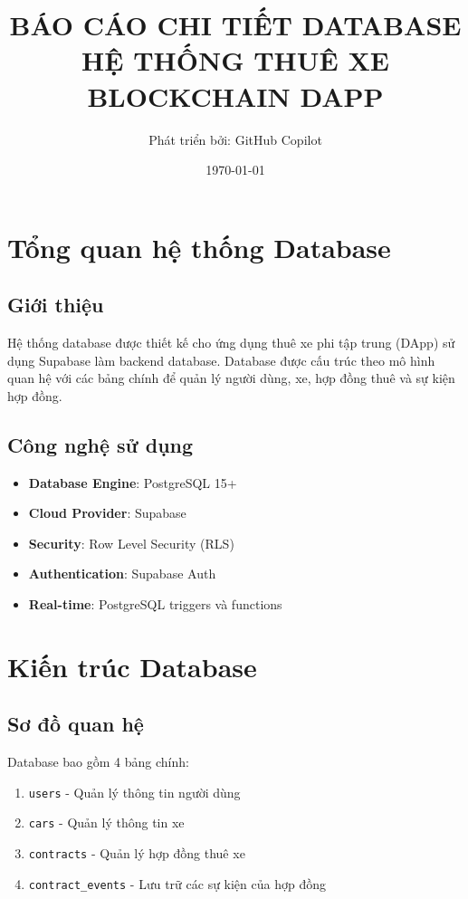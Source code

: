 \documentclass[12pt,a4paper]{article}
\title{\textbf{BÁO CÁO CHI TIẾT DATABASE} \\ 
       \textbf{HỆ THỐNG THUÊ XE BLOCKCHAIN DAPP}}
\author{Phát triển bởi: GitHub Copilot}
\date{\today}
\begin{document}
\maketitle
\tableofcontents
\newpage

\section{Tổng quan hệ thống Database}

\subsection{Giới thiệu}
Hệ thống database được thiết kế cho ứng dụng thuê xe phi tập trung (DApp) sử dụng Supabase làm backend database. Database được cấu trúc theo mô hình quan hệ với các bảng chính để quản lý người dùng, xe, hợp đồng thuê và sự kiện hợp đồng.

\subsection{Công nghệ sử dụng}
\begin{itemize}
    \item \textbf{Database Engine}: PostgreSQL 15+
    \item \textbf{Cloud Provider}: Supabase
    \item \textbf{Security}: Row Level Security (RLS)
    \item \textbf{Authentication}: Supabase Auth
    \item \textbf{Real-time}: PostgreSQL triggers và functions
\end{itemize}

\section{Kiến trúc Database}

\subsection{Sơ đồ quan hệ}
Database bao gồm 4 bảng chính:
\begin{enumerate}
    \item \texttt{users} - Quản lý thông tin người dùng
    \item \texttt{cars} - Quản lý thông tin xe
    \item \texttt{contracts} - Quản lý hợp đồng thuê xe
    \item \texttt{contract\_events} - Lưu trữ các sự kiện của hợp đồng
\end{enumerate}
\end{document}
